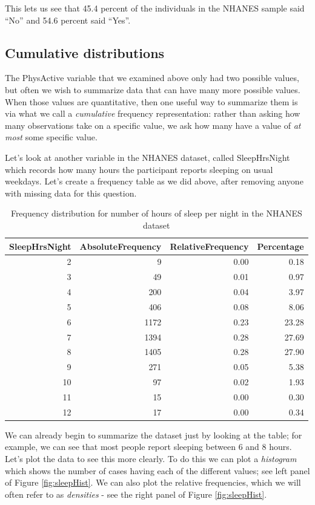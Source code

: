\documentclass[12pt,]{book}
\theoremstyle{definition}
\theoremstyle{definition}
\theoremstyle{definition}
\theoremstyle{remark}
\begin{document}
This lets us see that 45.4 percent of the individuals in the NHANES sample said ``No'' and 54.6 percent said ``Yes''.

\hypertarget{cumulative-distributions}{%
\subsection{Cumulative distributions}\label{cumulative-distributions}}

The PhysActive variable that we examined above only had two possible values, but often we wish to summarize data that can have many more possible values. When those values are quantitative, then one useful way to summarize them is via what we call a \emph{cumulative} frequency representation: rather than asking how many observations take on a specific value, we ask how many have a value of \emph{at most} some specific value.

Let's look at another variable in the NHANES dataset, called SleepHrsNight which records how many hours the participant reports sleeping on usual weekdays. Let's create a frequency table as we did above, after removing anyone with missing data for this question.

\begin{table}

\caption{\label{tab:unnamed-chunk-7}Frequency distribution for number of hours of sleep per night in the NHANES dataset}
\centering
\begin{tabular}[t]{r|r|r|r}
\hline
SleepHrsNight & AbsoluteFrequency & RelativeFrequency & Percentage\\
\hline
2 & 9 & 0.00 & 0.18\\
\hline
3 & 49 & 0.01 & 0.97\\
\hline
4 & 200 & 0.04 & 3.97\\
\hline
5 & 406 & 0.08 & 8.06\\
\hline
6 & 1172 & 0.23 & 23.28\\
\hline
7 & 1394 & 0.28 & 27.69\\
\hline
8 & 1405 & 0.28 & 27.90\\
\hline
9 & 271 & 0.05 & 5.38\\
\hline
10 & 97 & 0.02 & 1.93\\
\hline
11 & 15 & 0.00 & 0.30\\
\hline
12 & 17 & 0.00 & 0.34\\
\hline
\end{tabular}
\end{table}

We can already begin to summarize the dataset just by looking at the table; for example, we can see that most people report sleeping between 6 and 8 hours. Let's plot the data to see this more clearly. To do this we can plot a \emph{histogram} which shows the number of cases having each of the different values; see left panel of Figure \ref{fig:sleepHist}. We can also plot the relative frequencies, which we will often refer to as \emph{densities} - see the right panel of Figure \ref{fig:sleepHist}.
\end{document}
